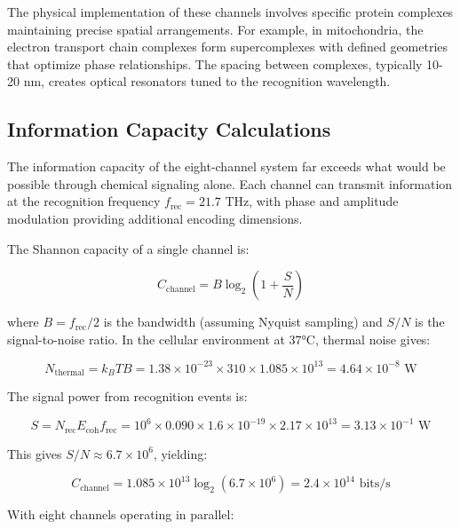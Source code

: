 \documentclass[12pt,a4paper]{report}
\begin{document}
The physical implementation of these channels involves specific protein complexes maintaining precise spatial arrangements. For example, in mitochondria, the electron transport chain complexes form supercomplexes with defined geometries that optimize phase relationships. The spacing between complexes, typically 10-20 nm, creates optical resonators tuned to the recognition wavelength.

\subsection{Information Capacity Calculations}

The information capacity of the eight-channel system far exceeds what would be possible through chemical signaling alone. Each channel can transmit information at the recognition frequency $f_{\text{rec}} = 21.7$ THz, with phase and amplitude modulation providing additional encoding dimensions.

The Shannon capacity of a single channel is:

\begin{equation}
C_{\text{channel}} = B \log_2\left(1 + \frac{S}{N}\right)
\end{equation}

where $B = f_{\text{rec}}/2$ is the bandwidth (assuming Nyquist sampling) and $S/N$ is the signal-to-noise ratio. In the cellular environment at 37°C, thermal noise gives:

\begin{equation}
N_{\text{thermal}} = k_B T B = 1.38 \times 10^{-23} \times 310 \times 1.085 \times 10^{13} = 4.64 \times 10^{-8} \text{ W}
\end{equation}

The signal power from recognition events is:

\begin{equation}
S = N_{\text{rec}} E_{\text{coh}} f_{\text{rec}} = 10^6 \times 0.090 \times 1.6 \times 10^{-19} \times 2.17 \times 10^{13} = 3.13 \times 10^{-1} \text{ W}
\end{equation}

This gives $S/N \approx 6.7 \times 10^6$, yielding:

\begin{equation}
C_{\text{channel}} = 1.085 \times 10^{13} \log_2(6.7 \times 10^6) = 2.4 \times 10^{14} \text{ bits/s}
\end{equation}

With eight channels operating in parallel:
\end{document}
